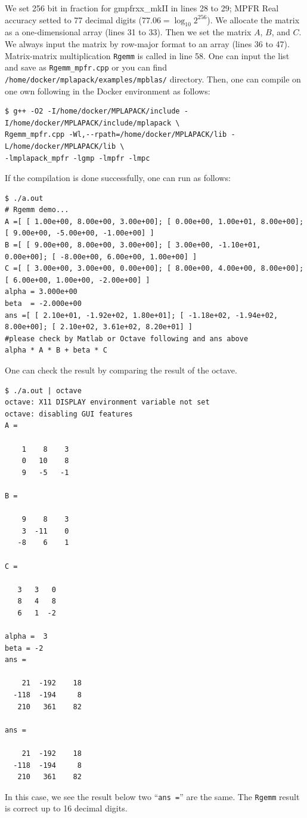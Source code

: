 \documentclass[12pt]{article}
\begin{document}
We set 256 bit in fraction for gmpfrxx_mkII in lines 28 to 29; MPFR Real accuracy setted to  77 decimal digits ($77.06 = \log_{10} 2^{256}$).
We allocate the matrix as a one-dimensional array (lines 31 to 33). Then we set the matrix $A$, $B$, and $C$. We always input the matrix by row-major format to an array (lines 36 to 47). Matrix-matrix multiplication {\tt Rgemm} is called in line 58.
One can input the list and save as {\tt Rgemm\_mpfr.cpp} or you can find {\tt /home/docker/mplapack/examples/mpblas/} directory.
Then, one can compile on one own following in the Docker environment as follows:
\begin{verbatim}
$ g++ -O2 -I/home/docker/MPLAPACK/include -I/home/docker/MPLAPACK/include/mplapack \
Rgemm_mpfr.cpp -Wl,--rpath=/home/docker/MPLAPACK/lib -L/home/docker/MPLAPACK/lib \
-lmplapack_mpfr -lgmp -lmpfr -lmpc
\end{verbatim}
If the compilation is done successfully, one can run as follows:
{\fontsize{9.5pt}{0.4cm}\selectfont
\begin{verbatim}
$ ./a.out
# Rgemm demo...
A =[ [ 1.00e+00, 8.00e+00, 3.00e+00]; [ 0.00e+00, 1.00e+01, 8.00e+00]; [ 9.00e+00, -5.00e+00, -1.00e+00] ]
B =[ [ 9.00e+00, 8.00e+00, 3.00e+00]; [ 3.00e+00, -1.10e+01, 0.00e+00]; [ -8.00e+00, 6.00e+00, 1.00e+00] ]
C =[ [ 3.00e+00, 3.00e+00, 0.00e+00]; [ 8.00e+00, 4.00e+00, 8.00e+00]; [ 6.00e+00, 1.00e+00, -2.00e+00] ]
alpha = 3.000e+00
beta  = -2.000e+00
ans =[ [ 2.10e+01, -1.92e+02, 1.80e+01]; [ -1.18e+02, -1.94e+02, 8.00e+00]; [ 2.10e+02, 3.61e+02, 8.20e+01] ]
#please check by Matlab or Octave following and ans above
alpha * A * B + beta * C
\end{verbatim}
}
One can check the result by comparing the result of the octave.
{\footnotesize
\begin{verbatim}
$ ./a.out | octave
octave: X11 DISPLAY environment variable not set
octave: disabling GUI features
A =

    1    8    3
    0   10    8
    9   -5   -1

B =

    9    8    3
    3  -11    0
   -8    6    1

C =

   3   3   0
   8   4   8
   6   1  -2

alpha =  3
beta = -2
ans =

    21  -192    18
  -118  -194     8
   210   361    82

ans =

    21  -192    18
  -118  -194     8
   210   361    82
\end{verbatim}
}
In this case, we see the result below two ``{\tt ans =}'' are the same. The {\tt Rgemm} result is correct up to 16 decimal digits.
\end{document}
